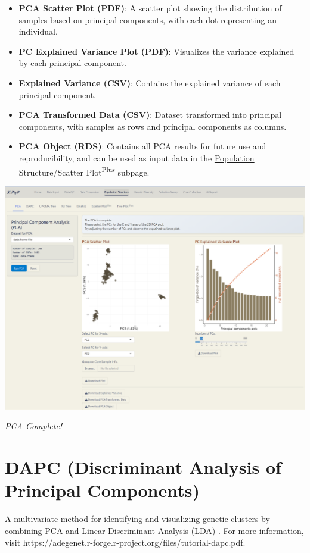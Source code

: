 \documentclass[
]{book}
\begin{document}
\begin{itemize}
\item
  \textbf{PCA Scatter Plot (PDF)}: A scatter plot showing the distribution of samples based on principal components, with each dot representing an individual.
\item
  \textbf{PC Explained Variance Plot (PDF)}: Visualizes the variance explained by each principal component.
\item
  \textbf{Explained Variance (CSV)}: Contains the explained variance of each principal component.
\item
  \textbf{PCA Transformed Data (CSV)}: Dataset transformed into principal components, with samples as rows and principal components as columns.
\item
  \textbf{PCA Object (RDS)}: Contains all PCA results for future use and reproducibility, and can be used as input data in the \ul{Population Structure}/\ul{Scatter Plot}\textsuperscript{Plus} subpage.
\end{itemize}

\includegraphics{images/clipboard-534056671.png}

\emph{PCA Complete!}

\section{DAPC (Discriminant Analysis of Principal Components)}\label{dapc-discriminant-analysis-of-principal-components}

A multivariate method for identifying and visualizing genetic clusters by combining PCA and Linear Discriminant Analysis (LDA) \citep{jombart2010}. For more information, visit https://adegenet.r-forge.r-project.org/files/tutorial-dapc.pdf.
\end{document}
